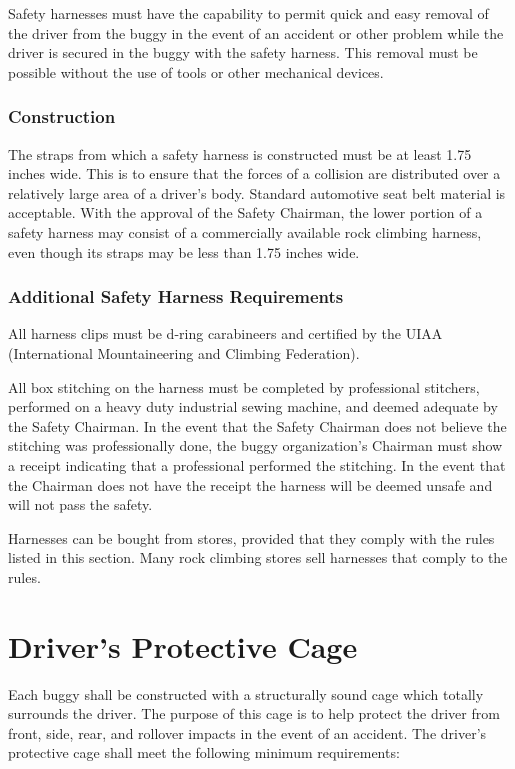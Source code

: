 	Safety harnesses must have the capability to permit quick and easy removal of the driver from the buggy in the event of an accident or other problem while the driver is secured in the buggy with the safety harness. This removal must be possible without the use of tools or other mechanical devices.

\subsubsection{Construction}

	The straps from which a safety harness is constructed must be at least 1.75 inches wide. This is to ensure that the forces of a collision are distributed over a relatively large area of a driver's body. Standard automotive seat belt material is acceptable. With the approval of the Safety Chairman, the lower portion of a safety harness may consist of a commercially available rock climbing harness, even though its straps may be less than 1.75 inches wide.

\subsubsection{Additional Safety Harness Requirements}

	All harness clips must be d-ring carabineers and certified by the UIAA (International Mountaineering and Climbing Federation).
	
	All box stitching on the harness must be completed by professional stitchers, performed on a heavy duty industrial sewing machine, and deemed adequate by the Safety Chairman. In the event that the Safety Chairman does not believe the stitching was professionally done, the buggy organization's Chairman must show a receipt indicating that a professional performed the stitching. In the event that the Chairman does not have the receipt the harness will be deemed unsafe and will not pass the safety. 
	
	Harnesses can be bought from stores, provided that they comply with the rules listed in this section. Many rock climbing stores sell harnesses that comply to the rules.

\section{Driver's Protective Cage}

	Each buggy shall be constructed with a structurally sound cage which totally surrounds the driver. The purpose of this cage is to help protect the driver from front, side, rear, and rollover impacts in the event of an accident. The driver's protective cage shall meet the following minimum requirements:

